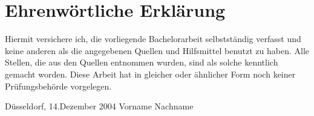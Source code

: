 \chapter*{Ehrenwörtliche Erklärung}

Hiermit versichere ich, die vorliegende Bachelorarbeit selbstständig 
verfasst und keine anderen als die angegebenen Quellen und Hilfsmittel
benutzt zu haben.
Alle Stellen, die aus den Quellen entnommen
wurden, sind als solche kenntlich gemacht worden. Diese Arbeit hat in
gleicher oder ähnlicher Form noch keiner Prüfungsbehörde vorgelegen.

\vspace{3cm}

\noindent Düsseldorf, 14.Dezember 2004 \hfill Vorname Nachname
